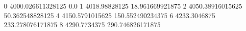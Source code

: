 0 4000.026611328125 0.0
1 4018.98828125 18.961669921875
2 4050.38916015625 50.362548828125
4 4150.5791015625 150.552490234375
6 4233.3046875 233.278076171875
8 4290.7734375 290.746826171875
